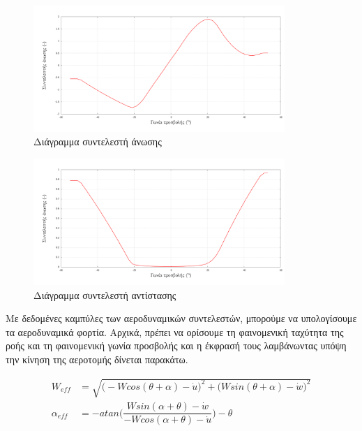 \begin{figure}[ht!]
    \begin{center}
        \includegraphics[width=0.85\textwidth]{figures/cl.pdf}
    \end{center}
    \caption{Διάγραμμα συντελεστή άνωσης}
    \label{fig:cl}
\end{figure}

\begin{figure}[ht!]
    \begin{center}
        \includegraphics[width=0.85\textwidth]{figures/cd.pdf}
    \end{center}
    \caption{Διάγραμμα συντελεστή αντίστασης}
    \label{fig:cd}
\end{figure}

Με δεδομένες καμπύλες των αεροδυναμικών συντελεστών, μπορούμε να υπολογίσουμε τα αεροδυναμικά φορτία. Αρχικά, πρέπει να ορίσουμε τη φαινομενική ταχύτητα της ροής και τη φαινομενική γωνία προσβολής και η έκφρασή τους λαμβάνωντας υπόψη την κίνηση της αεροτομής δίνεται παρακάτω.

\begin{align}
   W_{eff} &= \sqrt{\big(-Wcos(\theta+\alpha)-\dot{u}\big)^2 + \big(Wsin(\theta+\alpha)-\dot{w})^2}\\[6pt]\label{eq:weff}
   \alpha_{eff} &= -atan\Big(\dfrac{Wsin(\alpha + \theta)-\dot{w}}{-Wcos(\alpha+\theta)-\dot{u}}\Big) - \theta\label{eq:aeff}
\end{align}

